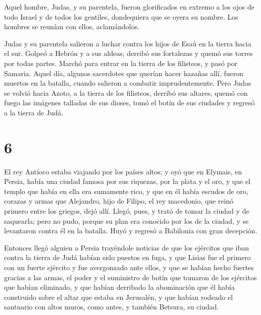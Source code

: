  Aquel hombre, Judas, y su parentela, fueron glorificados
en extremo a los ojos de todo Israel y de todos los gentiles,
dondequiera que se oyera su nombre.  Los hombres se
reunían con ellos, aclamándolos.

 Judas y su parentela salieron a luchar contra los hijos
de Esaú en la tierra hacia el sur. Golpeó a Hebrón y a sus aldeas,
derribó sus fortalezas y quemó sus torres por todas partes.
 Marchó para entrar en la tierra de los filisteos, y pasó
por Samaria.  Aquel día, algunos sacerdotes que querían
hacer hazañas allí, fueron muertos en la batalla, cuando salieron a
combatir imprudentemente.  Pero Judas se volvió hacia
Azoto, a la tierra de los filisteos, derribó sus altares, quemó con
fuego las imágenes talladas de sus dioses, tomó el botín de sus ciudades
y regresó a la tierra de Judá.

\hypertarget{section-5}{%
\section{6}\label{section-5}}

 El rey Antíoco estaba viajando por los países altos; y
oyó que en Elymais, en Persia, había una ciudad famosa por sus riquezas,
por la plata y el oro,  y que el templo que había en ella
era sumamente rico, y que en él había escudos de oro, corazas y armas
que Alejandro, hijo de Filipo, el rey macedonio, que reinó primero entre
los griegos, dejó allí.  Llegó, pues, y trató de tomar la
ciudad y de saquearla; pero no pudo, porque su plan era conocido por los
de la ciudad,  y se levantaron contra él en la batalla.
Huyó y regresó a Babilonia con gran decepción.

 Entonces llegó alguien a Persia trayéndole noticias de
que los ejércitos que iban contra la tierra de Judá habían sido puestos
en fuga,  y que Lisias fue el primero con un fuerte
ejército y fue avergonzado ante ellos, y que se habían hecho fuertes
gracias a las armas, el poder y el suministro de botín que tomaron de
los ejércitos que habían eliminado,  y que habían
derribado la abominación que él había construido sobre el altar que
estaba en Jerusalén, y que habían rodeado el santuario con altos muros,
como antes, y también Betsura, su ciudad.

